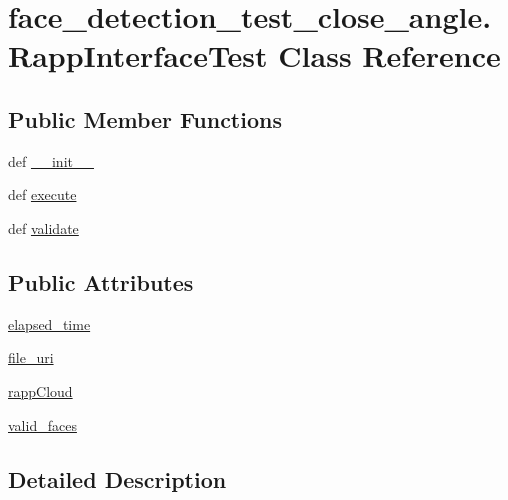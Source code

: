 \hypertarget{classface__detection__test__close__angle_1_1RappInterfaceTest}{\section{face\-\_\-detection\-\_\-test\-\_\-close\-\_\-angle.\-Rapp\-Interface\-Test Class Reference}
\label{classface__detection__test__close__angle_1_1RappInterfaceTest}
}
\subsection*{Public Member Functions}
\begin{DoxyCompactItemize}
\item 
def \hyperlink{classface__detection__test__close__angle_1_1RappInterfaceTest_a71369607f443c18d24421609441f4ee8}{\-\_\-\-\_\-init\-\_\-\-\_\-}
\item 
def \hyperlink{classface__detection__test__close__angle_1_1RappInterfaceTest_a2e1d984366226c08116d462c3d717582}{execute}
\item 
def \hyperlink{classface__detection__test__close__angle_1_1RappInterfaceTest_a4751fdff889b779285885d37861a4d24}{validate}
\end{DoxyCompactItemize}
\subsection*{Public Attributes}
\begin{DoxyCompactItemize}
\item 
\hyperlink{classface__detection__test__close__angle_1_1RappInterfaceTest_a6efac6774f7a57caeab7fbe3adc2abc6}{elapsed\-\_\-time}
\item 
\hyperlink{classface__detection__test__close__angle_1_1RappInterfaceTest_aae6ce80e7795a376fdda1c4d5545ab07}{file\-\_\-uri}
\item 
\hyperlink{classface__detection__test__close__angle_1_1RappInterfaceTest_af2996d542ea93ea20d57508ebe38e525}{rapp\-Cloud}
\item 
\hyperlink{classface__detection__test__close__angle_1_1RappInterfaceTest_af862bf3dc27ad26cc3a8683d1ad00173}{valid\-\_\-faces}
\end{DoxyCompactItemize}


\subsection{Detailed Description}


